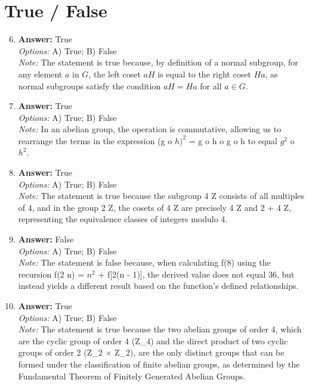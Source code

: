 \documentclass[12pt]{article}
\begin{document}
\section*{True / False}
\begin{enumerate}[label=\arabic*.]
\setcounter{enumi}{5}
\item \textbf{Answer:} True
\\ \textit{Options:} A) True; B) False
\\ \textit{Note:} The statement is true because, by definition of a normal subgroup, for any element \( a \) in \( G \), the left coset \( aH \) is equal to the right coset \( Ha \), as normal subgroups satisfy the condition \( aH = Ha \) for all \( a \in G \).
\item \textbf{Answer:} True
\\ \textit{Options:} A) True; B) False
\\ \textit{Note:} In an abelian group, the operation is commutative, allowing us to rearrange the terms in the expression (g o $h)^2$ = g o h o g o h to equal $g^2$ o $h^2$.
\item \textbf{Answer:} True
\\ \textit{Options:} A) True; B) False
\\ \textit{Note:} The statement is true because the subgroup 4 Z consists of all multiples of 4, and in the group 2 Z, the cosets of 4 Z are precisely 4 Z and 2 + 4 Z, representing the equivalence classes of integers modulo 4.
\item \textbf{Answer:} False
\\ \textit{Options:} A) True; B) False
\\ \textit{Note:} The statement is false because, when calculating f(8) using the recursion f(2 n) = $n^2$ + f[2(n - 1)], the derived value does not equal 36, but instead yields a different result based on the function's defined relationships.
\item \textbf{Answer:} True
\\ \textit{Options:} A) True; B) False
\\ \textit{Note:} The statement is true because the two abelian groups of order 4, which are the cyclic group of order 4 (Z\_4) and the direct product of two cyclic groups of order 2 (Z\_2 × Z\_2), are the only distinct groups that can be formed under the classification of finite abelian groups, as determined by the Fundamental Theorem of Finitely Generated Abelian Groups.
\end{enumerate}
\end{document}

